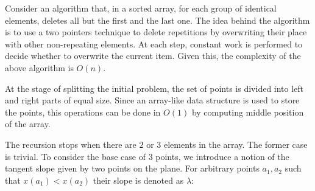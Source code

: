 \documentclass[a4paper,english,numberwithinsect,notab]{eurocg20-submission}
\begin{document}
	Consider an algorithm that, in a sorted array, for each group of identical elements, deletes all but the first and the last one. The idea behind the algorithm is to use a two pointers technique to delete repetitions by overwriting their place with other non-repeating elements. At each step, constant work is performed to decide whether to overwrite the current item. Given this, the complexity of the above algorithm is $O(n)$.
	
	
	
	
	
	
	At the stage of splitting the initial problem, the set of points is divided into left and right parts of equal size. Since an array-like data structure is used to store the points, this operations can be done in $O(1)$ by computing middle position of the array.
	
	The recursion stops when there are $2$ or $3$ elements in the array. The former case is trivial. To consider the base case of $3$ points, we introduce a notion of the tangent slope given by two points on the plane. For arbitrary points $a_1, a_2$ such that $x(a_1)<x(a_2)$ their slope is denoted as $\lambda$:
	
\end{document}
